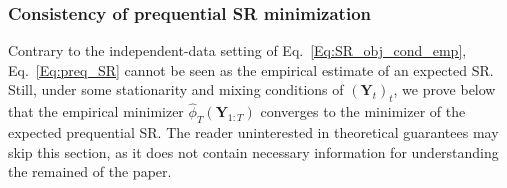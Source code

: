 \documentclass[twoside,11pt]{article}
\newcommand{\ddobs}{\mathbf{y}}
\newcommand{\Ddobs}{\mathbf{Y}}
\newcommand{\DdobsupT}{\mathbf{Y}_{1:T}}
\begin{document}
	\subsubsection{Consistency of prequential SR minimization}\label{sec:consistency}
	
	
	Contrary to the independent-data setting of Eq.~\eqref{Eq:SR_obj_cond_emp}, Eq.~\eqref{Eq:preq_SR} cannot be seen as the empirical estimate of an expected SR. 
	Still, under some stationarity and mixing conditions of $ (\Ddobs_t)_t $, we prove below that the empirical minimizer $ \hat \phi_T(\DdobsupT) $ converges to the minimizer of the expected prequential SR. The reader uninterested in theoretical guarantees may skip this section, as it does not contain necessary information for understanding the remained of the paper.
	
	
	
\end{document}
